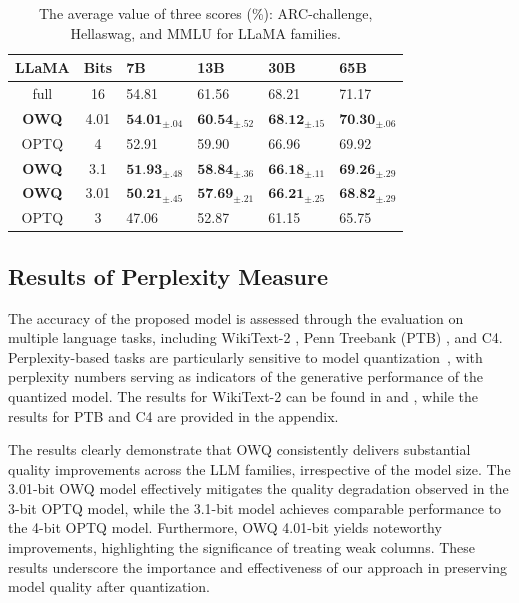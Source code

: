 \documentclass[letterpaper]{article} %
\begin{document}
\begin{table}[t]
        \centering
        \small
        \begin{tabular}{@{\hskip 0.05in} c @{\hskip 0.05in} | @{\hskip 0.05in} c @{\hskip 0.05in} | @{\hskip 0.1in} l @{\hskip 0.08in} l @{\hskip 0.08in} l @{\hskip 0.08in} l @{\hskip 0.05in}}
            \toprule
            LLaMA & Bits & 7B & 13B & 30B & 65B \\
            \midrule
            full & 16 & 54.81 & 61.56 & 68.21 & 71.17 \\
            \midrule
            \textbf{OWQ} & 4.01 & $\textbf{54.01}_{\pm.04}$ & $\textbf{60.54}_{\pm.52}$ & $\textbf{68.12}_{\pm.15}$ & $\textbf{70.30}_{\pm.06}$ \\
            OPTQ & 4 & 52.91 & 59.90 & 66.96 & 69.92 \\
            \midrule
            \textbf{OWQ} & 3.1 & $\textbf{51.93}_{\pm.48}$ & $\textbf{58.84}_{\pm.36}$ & $\textbf{66.18}_{\pm.11}$ & $\textbf{69.26}_{\pm.29}$ \\
            \textbf{OWQ} & 3.01 & $\textbf{50.21}_{\pm.45}$ & $\textbf{57.69}_{\pm.21}$ & $\textbf{66.21}_{\pm.25}$ & $\textbf{68.82}_{\pm.29}$ \\
            OPTQ & 3 & 47.06 & 52.87 & 61.15 & 65.75 \\
            \bottomrule
        \end{tabular}
        \caption{The average value of three scores (\%): ARC-challenge,
Hellaswag, and MMLU for LLaMA families.
}
        \label{table:llama_zeroshot}
\end{table}

\subsection{Results of Perplexity Measure}\label{sec:perplexity}

The accuracy of the proposed model is assessed through the evaluation on multiple language tasks, including WikiText-2 \cite{merity2016pointer}, Penn Treebank (PTB) \cite{marcus1994penn}, and C4. Perplexity-based tasks are particularly sensitive to model quantization~\cite{frantar2023optq}, with perplexity numbers serving as indicators of the generative performance of the quantized model. The results for WikiText-2 can be found in  and , while the results for PTB and C4 are provided in the appendix.

The results clearly demonstrate that OWQ consistently delivers substantial quality improvements across the LLM families, irrespective of the model size. The 3.01-bit OWQ model effectively mitigates the quality degradation observed in the 3-bit OPTQ model, while the 3.1-bit model achieves comparable performance to the 4-bit OPTQ model. Furthermore, OWQ 4.01-bit yields noteworthy improvements, highlighting the significance of treating weak columns. These results underscore the importance and effectiveness of our approach in preserving model quality after quantization. 
\end{document}
